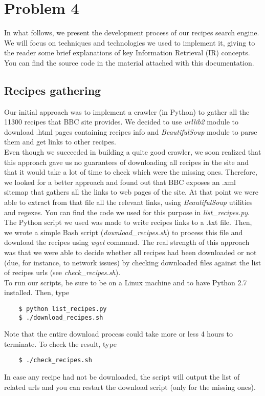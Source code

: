 
\section{Problem 4}

In what follows, we present the development process of our recipes search engine. We will focus on techniques and technologies we used to implement it, giving to the reader some brief explanations of key Information Retrieval (IR) concepts. You can find the source code in the material attached with this documentation.


\subsection{Recipes gathering}

Our initial approach was to implement a crawler (in Python) to gather all the 11300 recipes that BBC site\cite{bbc} provides. We decided to use \textit{urllib2}\cite{urllib2} module to download .html pages containing recipes info and \textit{BeautifulSoup}\cite{beaut_soup} module to parse them and get links to other recipes.\\
Even though we succeeded in building a quite good crawler, we soon realized that this approach gave us no guarantees of downloading all recipes in the site and that it would take a lot of time to check which were the missing ones. Therefore, we looked for a better approach and found out that BBC exposes an .xml sitemap that gathers all the links to web pages of the site. At that point we were able to extract from that file all the relevant links, using \textit{BeautifulSoup}\cite{beaut_soup} utilities and regexes. You can find the code we used for this purpose in \textit{list\_recipes.py}.\\
The Python script we used was made to write recipes links to a .txt file. Then, we wrote a simple Bash script (\textit{download\_recipes.sh}) to process this file and download the recipes using \textit{wget} command. The real strength of this approach was that we were able to decide whether all recipes had been downloaded or not (due, for instance, to network issues) by checking downloaded files against the list of recipes urls (see \textit{check\_recipes.sh}).\\
To run our scripts, be sure to be on a Linux machine and to have Python 2.7 installed. Then, type
\begin{lstlisting}
	$ python list_recipes.py
	$ ./download_recipes.sh
\end{lstlisting}
Note that the entire download process could take more or less 4 hours to terminate. To check the result, type
\begin{lstlisting}
	$ ./check_recipes.sh
\end{lstlisting}
In case any recipe had not be downloaded, the script will output the list of related urls and you can restart the download script (only for the missing ones).


